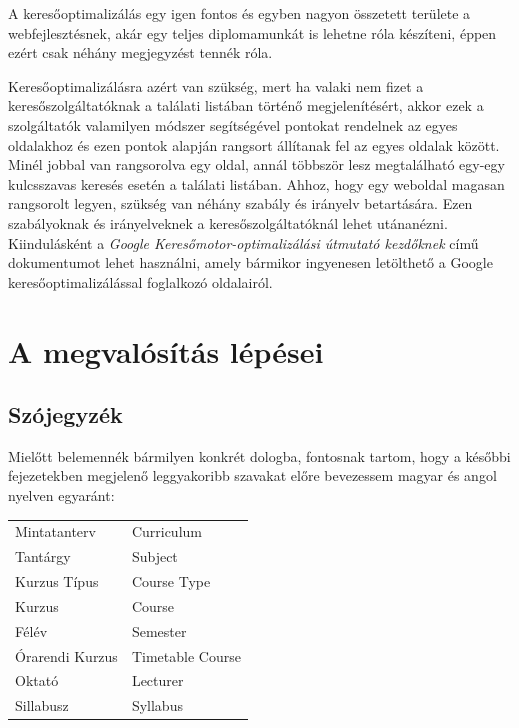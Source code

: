 \documentclass[hidelinks, 12pt, a4paper]{report}
\begin{document}
A keresőoptimalizálás egy igen fontos és egyben nagyon összetett területe a webfejlesztésnek, akár egy teljes diplomamunkát is lehetne róla készíteni, éppen ezért csak néhány megjegyzést tennék róla.

Keresőoptimalizálásra azért van szükség, mert ha valaki nem fizet a keresőszolgáltatóknak a találati listában történő megjelenítésért, akkor ezek a szolgáltatók valamilyen módszer segítségével pontokat rendelnek az egyes oldalakhoz és ezen pontok alapján rangsort állítanak fel az egyes oldalak között. Minél jobbal van rangsorolva egy oldal, annál többször lesz megtalálható egy-egy kulcsszavas keresés esetén a találati listában. Ahhoz, hogy egy weboldal magasan rangsorolt legyen, szükség van néhány szabály és irányelv betartására. Ezen szabályoknak és irányelveknek a keresőszolgáltatóknál lehet utánanézni. Kiindulásként a \emph{Google Keresőmotor-optimalizálási útmutató kezdőknek} című dokumentumot lehet használni, amely bármikor ingyenesen letölthető a Google keresőoptimalizálással foglalkozó oldalairól.


\chapter{A megvalósítás lépései}

\section{Szójegyzék}

Mielőtt belemennék bármilyen konkrét dologba, fontosnak tartom, hogy a későbbi fejezetekben megjelenő leggyakoribb szavakat előre bevezessem magyar és angol nyelven egyaránt:


\begin{table}[H]
	\centering
	\begin{tabular}{ l | l }
	Mintatanterv & Curriculum \\
	Tantárgy & Subject \\
	Kurzus Típus & Course Type \\
	Kurzus & Course \\
	Félév & Semester \\
	Órarendi Kurzus & Timetable Course \\
	Oktató & Lecturer \\
	Sillabusz & Syllabus
\end{tabular}
\end{table}
\end{document}
